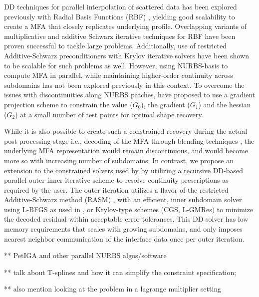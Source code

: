 \documentclass[conference]{IEEEtran}
\begin{document}
DD techniques for parallel interpolation of scattered data has been explored previously with Radial Basis Functions (RBF) \cite{mai-approx-rbf}, yielding good scalability to create a MFA that closely replicates underlying profile. Overlapping variants of multiplicative and additive Schwarz iterative techniques for RBF \cite{ddm-rbf} have been proven successful to tackle large problems. Additionally, use of restricted Additive-Schwarz preconditioners with Krylov iterative solvers have been shown to be scalable \cite{yokota-rasm-rbf} for such problems as well. However, using NURBS-basis to compute MFA in parallel, while maintaining higher-order continuity across subdomains has not been explored previously in this context. To overcome the issues with discontinuities along NURBS patches, \cite{zhang-nurbs-continuity} have proposed to use a gradient projection scheme to constrain the value ($G_0$), the gradient ($G_1$) and the hessian ($G_2$) at a small number of test points for optimal shape recovery. 



While it is also possible to create such a constrained recovery during the actual post-processing stage i.e., decoding of the MFA through blending techniques \cite{grindeanu-blending}, the underlying MFA representation would remain discontinuous, and would become more so with increasing number of subdomains. In contrast, we propose an extension to the constrained solvers used by \cite{zhang-nurbs-continuity, xu-jahn-discrete-adjoint} by utilizing a recursive DD-based parallel outer-inner iterative scheme to resolve continuity prescriptions as required by the user. The outer iteration utilizes a flavor of the restricted Additive-Schwarz method (RASM) \cite{gander-rasm}, with an efficient, inner subdomain solver using L-BFGS as used in \cite{zheng-bo-bspline-bfgs}, or Krylov-type schemes (CGS, L-GMRes) to minimize the decoded residual within acceptable error tolerances. This DD solver has low memory requirements that scales with growing subdomains, and only imposes nearest neighbor communication of the interface data once per outer iteration. 

{\color{red}
	
	** PetIGA and other parallel NURBS algos/software
	
	** talk about T-splines and how it can simplify the constraint specification; 
	
	** also mention looking at the problem in a lagrange multiplier setting
	
}
\end{document}
